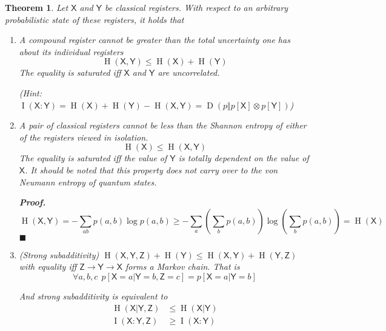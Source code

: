 \documentclass[aps,pra,onecolumn,notitlepage,superscriptaddress]{revtex4-1}
\newcommand{\reg}[1]{\mathsf{#1}}
\newcommand{\op}[1]{\operatorname{#1}}
\newtheorem{theo}{Theorem}
\def\Proof{{\bf Proof.~}}
\def\qed{$\blacksquare$ \newline}
\begin{document}
    \begin{theo}
        Let $\reg X$ and $\reg Y$ be classical registers. With respect to an arbitrary probabilistic state of these
        registers, it holds that
        \begin{enumerate}
            \item A compound register cannot be greater than the total uncertainty one has about its individual registers
            \begin{equation}
                \op H(\reg X, \reg Y) \leq \op H(\reg X) + \op H(\reg Y)
            \end{equation}
            The equality is saturated iff $\reg X$ and $\reg Y$ are uncorrelated.

            (Hint: $\op I(\reg X:\reg Y) = \op H(\reg X) + \op H(\reg Y) - \op H(\reg X, \reg Y) = \op D(p \Vert p[\reg X] \otimes p[\reg Y])$)
            \item A pair of classical registers cannot be less than the Shannon entropy of either of the registers viewed in isolation.
            \begin{equation}
                \op H(\reg X) \leq \op H(\reg X, \reg Y)
            \end{equation}
            The equality is saturated iff the value of $\reg Y$ is totally dependent on the value of $\reg X$. It should be noted that this property does not carry over to the von Neumann entropy of quantum states.

            \Proof
            \begin{equation}
                \op H(\reg X, \reg Y) = -\sum_{ab} p(a,b) \log p(a,b) \geq -\sum_a (\sum_b p(a,b)) \log (\sum_b p(a,b)) = \op H(\reg X)
            \end{equation}
            \qed

            \item (Strong subadditivity) $\op H(\reg{X,Y,Z}) + \op H(\reg Y) \leq \op H(\reg X, \reg Y) + \op H(\reg Y, \reg Z)$ with equality iff $\reg Z \to \reg Y \to \reg X$ forms a Markov chain. That is
            \begin{equation}
                \forall a,b,c \ \ p[\reg X=a | \reg Y=b, \reg Z=c] = p[\reg X=a | \reg Y=b]
            \end{equation}

            And strong subadditivity is equivalent to
            \begin{align*}
                \op H(\reg X | \reg Y, \reg Z) &\leq \op H(\reg X | \reg Y) \\
                \op I(\reg X : \reg Y, \reg Z) &\geq \op I(\reg X : \reg Y)
            \end{align*}
        \end{enumerate}
    \end{theo}
    
\end{document}
